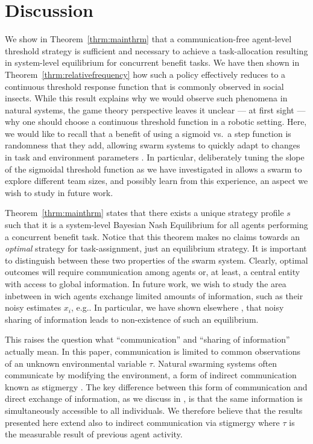 \documentclass[conference]{ieeeconf}
\begin{document}
\section{Discussion}\label{sec:disc}
We show in Theorem~\ref{thrm:mainthrm} that a communication-free agent-level threshold strategy is sufficient and necessary to achieve a task-allocation resulting in system-level equilibrium for concurrent benefit tasks. We have then shown in Theorem~\ref{thrm:relativefrequency} how such a policy effectively reduces to a continuous threshold response function that is commonly observed in social insects. While this result explains why we would observe such phenomena in natural systems, the game theory perspective leaves it unclear --- at first sight --- why one should choose a continuous threshold function in a robotic setting. Here, we would like to recall that a benefit of using a sigmoid vs.\ a step function is randomness that they add, allowing swarm systems to quickly adapt to changes in task and environment parameters \cite{Bonabeau1997}. In particular, deliberately tuning the slope of the sigmoidal threshold function as we have investigated in \cite{Kanakia2014} allows a swarm to explore different team sizes, and possibly learn from this experience, an aspect we wish to study in future work. 

Theorem~\ref{thrm:mainthrm} states that there exists a unique strategy profile $s$ such that it is a system-level Bayesian Nash Equilibrium for all agents performing a concurrent benefit task. Notice that this theorem makes no claims towards an \emph{optimal} strategy for task-assignment, just an equilibrium strategy. It is important to distinguish between these two properties of the swarm system. Clearly, optimal outcomes will require communication among agents or, at least, a central entity with access to global information. In future work, we wish to study the area inbetween in wich agents exchange limited amounts of information, such as their noisy estimates $x_i$, e.g.. In particular, we have shown elsewhere \cite{Touri2014}, that noisy sharing of information leads to non-existence of such an equilibrium.

This raises the question what ``communication'' and ``sharing of information'' actually mean. In this paper, communication is limited to common observations of an unknown environmental variable $\tau$. Natural swarming systems often communicate by modifying the environment, a form of indirect communication known as stigmergy \cite{grasse1959reconstruction}. The key difference between this form of communication and direct exchange of information, as we discuss in \cite{Touri2014}, is that the same information is simultaneously accessible to all individuals. We therefore believe that the results presented here extend also to indirect communication via stigmergy where $\tau$ is the measurable result of previous agent activity.
\end{document}
